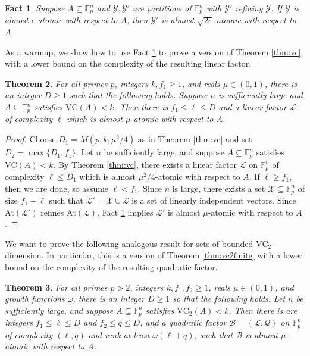 \documentclass[12pt,oneside,british,a4wide]{amsart}
\newtheorem{theorem}{Theorem}[section]
\newtheorem{fact}[theorem]{Fact}
\numberwithin{equation}{section}
\theoremstyle{definition}
\def\F{\mathbb{F}}
\def\VC{\mathrm{VC}}
\def\e{\epsilon}
\newcommand{\calL}{\mathcal{L}}
\newcommand{\calB}{\mathcal{B}}
\newcommand{\calQ}{\mathcal{Q}}
\newcommand{\calX}{\mathcal{X}}
\newcommand{\calY}{\mathcal{Y}}
\newcommand{\At}{{\mathrm{At}}}
\begin{document}
\begin{fact}\label{fact:aveofavecor}
Suppose $A\subseteq \F_p^n$ and $\calY,\calY'$ are partitions of $\F_p^n$ with $\calY'$ refining $\calY$.  If $\calY$ is almost $\e$-atomic with respect to $A$, then $\calY'$ is almost $\sqrt{2\e}$-atomic with respect to $A$. 
\end{fact}
 

As a warmup, we show how to use Fact \ref{fact:aveofavecor} to prove a version of Theorem \ref{thm:vc} with a lower bound on the complexity of the resulting linear factor.


\begin{theorem}\label{thm:linearlower}
For all primes $p$, integers $k,f_1\geq 1$, and reals $\mu\in (0,1)$, there is an integer $D\geq 1$ such that the following holds. Suppose $n$ is sufficiently large and $A\subseteq \F_p^n$ satisfies $\VC(A)<k$.  Then there is $f_1\leq \ell\leq D$ and a linear factor $\calL$ of complexity $\ell$ which is almost $\mu$-atomic with respect to $A$.
\end{theorem}
\begin{proof} Choose $D_1=M(p,k,\mu^2/4)$ as in Theorem \ref{thm:vc} and set $D_2=\max\{D_1,f_1\}$. Let $n$ be sufficiently large, and suppose $A\subseteq \F_p^n$ satisfies $\VC(A)<k$. By Theorem \ref{thm:vc}, there exists a linear factor $\calL$ on $\F_p^n$ of complexity $\ell\leq D_1$   which is almost $\mu^2/4$-atomic with respect to $A$.  If $\ell\geq f_1$, then we are done, so assume $\ell<f_1$.  Since $n$ is large, there exists a set $\calX\subseteq\F_p^n$ of size $f_1-\ell$ such that $\calL'=\calX\cup \calL$ is a set of linearly independent vectors.  Since $\At(\calL')$ refines $\At(\calL)$, Fact \ref{fact:aveofavecor} implies $\calL'$ is almost $\mu$-atomic with respect to $A$.
\end{proof}


We want to prove the following analogous result for sets of bounded $\VC_2$-dimension. In particular, this is a version of Theorem \ref{thm:vc2finite} with a lower bound on the complexity of the resulting quadratic factor.

\begin{theorem}\label{thm:quadlb}
For all primes $p>2$,  integers $k,f_1,f_2\geq 1$, reals $\mu\in (0,1)$, and growth functions $\omega$, there is an integer $D\geq 1$ so that the following holds. Let $n$ be sufficiently large, and suppose  $A\subseteq \F_p^n$ satisfies $\VC_2(A)<k$.  Then there is are integers $f_1\leq \ell\leq D$ and $f_2\leq q\leq D$, and a quadratic factor $\calB=(\calL,\calQ)$ on $\F_p^n$ of complexity $(\ell,q)$ and rank at least $\omega(\ell+q)$, such that $\calB$ is almost $\mu$-atomic with respect to $A$.
\end{theorem}
\end{document}
